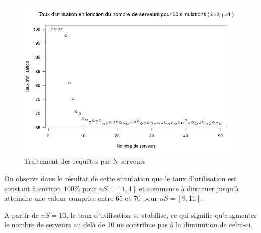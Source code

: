 \documentclass[12pt,a4paper]{article}
\begin{document}
    \begin{center}
        \begin{figure}[H]
            \includegraphics[scale=0.7]{busyRate.png}
            \caption{Traitement des requêtes par N serveurs}
        \end{figure}
    \end{center}

    On observe dans le résultat de cette simulation que le taux d'utilisation est constant à environ $100\%$ pour $nS = [{1},{4}]$ et commence à diminuer jusqu'à atteindre une valeur comprise entre 65 et 70 pour $nS = [{9},{11}]$.
    \newline
    \par A partir de $nS = 10$, le taux d'utilisation se stabilise, ce qui signifie qu'augmenter le nombre de serveurs au delà de 10 ne contribue pas à la diminution de celui-ci.

    
\end{document}
